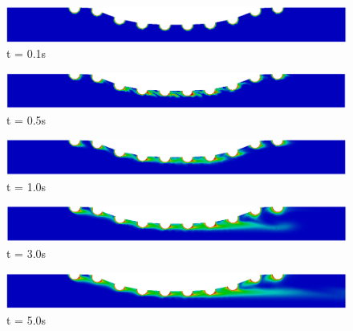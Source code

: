\begin{figure}[H]
     \begin{minipage}{.50\linewidth}
      \centering
      \includegraphics[scale=0.18]{./02_chaps/cap_solution/figure/conc100_CurvedStrut1.png}\\
      t = 0.1s
     \end{minipage}%
     \begin{minipage}{.50\linewidth}
      \centering
      \includegraphics[scale=0.18]{./02_chaps/cap_solution/figure/conc100_CurvedStrut2.png}\\
      t = 0.5s
     \end{minipage}
     \begin{minipage}{.50\linewidth}
     \medskip
      \centering
      \includegraphics[scale=0.18]{./02_chaps/cap_solution/figure/conc100_CurvedStrut3.png}\\
      t = 1.0s
     \end{minipage}%
     \begin{minipage}{.50\linewidth}
     \medskip
      \centering
      \includegraphics[scale=0.18]{./02_chaps/cap_solution/figure/conc100_CurvedStrut4.png}\\
      t = 3.0s
     \end{minipage}
     \begin{minipage}{.50\linewidth}
      \centering
      \includegraphics[scale=0.18]{./02_chaps/cap_solution/figure/conc100_CurvedStrut5.png}\\
      t = 5.0s
     \end{minipage}%

\end{figure}
